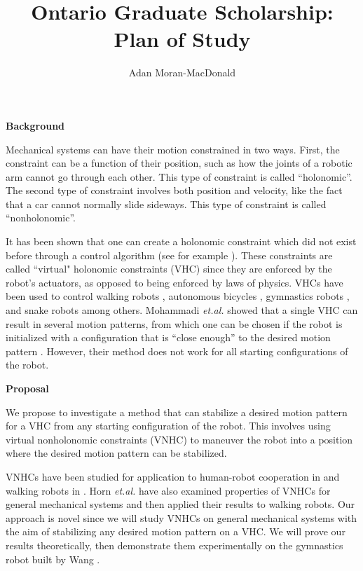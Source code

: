\documentclass[a4paper,12pt]{article}
\begin{document}
\title{Ontario Graduate Scholarship: Plan of Study}
\author{Adan Moran-MacDonald}
\date{}
\maketitle

\begin{large}
\textbf{Background}
\end{large}


Mechanical systems can have their motion constrained in two ways. First, the
constraint can be a function of their position, such as how the joints of a
robotic arm cannot go through each other. This type of constraint is called
``holonomic”. The second type of constraint involves both position and velocity,
like the fact that a car cannot normally slide sideways. This type of constraint
is called ``nonholonomic”.

It has been shown that one can create a holonomic constraint which did not exist
before through a control algorithm (see for example \cite{vhcs_for_el_systems}).
These constraints are called ``virtual" holonomic constraints (VHC) since they
are enforced by the robot’s actuators, as opposed to being enforced by laws of
physics. VHCs have been used to control walking robots \cite{stable-walking},
autonomous bicycles \cite{bicycle}, gymnastics robots \cite{xingbo-thesis}, and
snake robots \cite{snake-robot} among others. Mohammadi \textit{et.al.} showed
that a single VHC can result in several motion patterns, from which one can be
chosen if the robot is initialized with a configuration that is ``close enough”
to the desired motion pattern \cite{manfredi-orbit-stabilization}. However,
their method does not work for all starting configurations of the robot.

\begin{large} \textbf{Proposal} \end{large}

We propose to investigate a method that can stabilize a desired motion pattern
for a VHC from any starting configuration of the robot. This involves using
virtual nonholonomic constraints (VNHC) to maneuver the robot into a position
where the desired motion pattern can be stabilized. 

VNHCs have been studied for application to human-robot cooperation in
\cite{vnhc-human-robot-coop} and walking robots in \cite{vnhc-biped-robot}. Horn
\textit{et.al.} have also examined properties of VNHCs for general mechanical
systems \cite{hybrid_zero_dynamics_bipedal_nhvcs} and then applied their results
to walking robots. Our approach is novel since we will study VNHCs on general
mechanical systems with the aim of stabilizing any desired motion pattern on a
VHC. We will prove our results theoretically, then demonstrate them
experimentally on the gymnastics robot built by Wang \cite{xingbo-thesis}.
\end{document}
